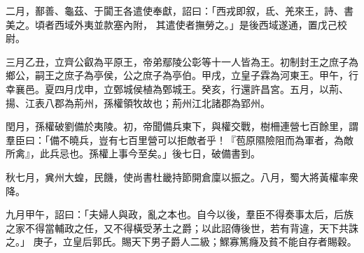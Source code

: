 \begin{pinyinscope}
二月，鄯善、龜茲、于闐王各遣使奉獻，詔曰：「西戎即叙，氐、羌來王，詩、書美之。頃者西域外夷並款塞內附，
其遣使者撫勞之。」是後西域遂通，置戊己校尉。




三月乙丑，立齊公叡為平原王，帝弟鄢陵公彰等十一人皆為王。初制封王之庶子為鄉公，嗣王之庶子為亭侯，公之庶子為亭伯。甲戌，立皇子霖為河東王。甲午，行幸襄邑。夏四月戊申，立鄄城侯植為鄄城王。癸亥，行還許昌宮。五月，以荊、揚、江表八郡為荊州，孫權領牧故也；荊州江北諸郡為郢州。




閏月，孫權破劉備於夷陵。初，帝聞備兵東下，與權交戰，樹柵連營七百餘里，謂羣臣曰：「備不曉兵，豈有七百里營可以拒敵者乎！『苞原隰險阻而為軍者，為敵所禽』，此兵忌也。孫權上事今至矣。」後七日，破備書到。


秋七月，兾州大蝗，民饑，使尚書杜畿持節開倉廩以振之。八月，蜀大將黃權率衆降。


九月甲午，詔曰：「夫婦人與政，亂之本也。自今以後，羣臣不得奏事太后，后族之家不得當輔政之任，又不得橫受茅土之爵；以此詔傳後世，若有背違，天下共誅之。」
庚子，立皇后郭氏。賜天下男子爵人二級；鰥寡篤癃及貧不能自存者賜穀。



\end{pinyinscope}
